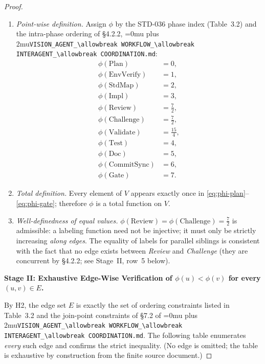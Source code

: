 \documentclass[12pt]{article}
\theoremstyle{definition}
\DeclareRobustCommand{\code}[1]{\begingroup\Urlmuskip=0mu plus 2mu\relax\nolinkurl{#1}\endgroup}
\newcommand{\VisionFlow}{\code{VISION\_AGENT\_\allowbreak WORKFLOW\_\allowbreak INTERAGENT\_\allowbreak COORDINATION.md}}
\begin{document}
\begin{proof}
\begin{enumerate}
  \item \emph{Point-wise definition.} Assign $\phi$ by the STD-036 phase
        index (Table~3.2) and the intra-phase ordering of
        \S4.2.2,
        \VisionFlow{}:
        \begin{align}
          \phi(\mathrm{Plan})        &= 0,   \label{eq:phi-plan}\\
          \phi(\mathrm{EnvVerify})   &= 1,   \label{eq:phi-env}\\
          \phi(\mathrm{StdMap})      &= 2,   \label{eq:phi-std}\\
          \phi(\mathrm{Impl})        &= 3,   \label{eq:phi-impl}\\
          \phi(\mathrm{Review})      &= \tfrac{7}{2}, \label{eq:phi-rev}\\
          \phi(\mathrm{Challenge})   &= \tfrac{7}{2}, \label{eq:phi-chal}\\
          \phi(\mathrm{Validate})    &= \tfrac{15}{4},\label{eq:phi-val}\\
          \phi(\mathrm{Test})        &= 4,   \label{eq:phi-test}\\
          \phi(\mathrm{Doc})         &= 5,   \label{eq:phi-doc}\\
          \phi(\mathrm{CommitSync})  &= 6,   \label{eq:phi-cs}\\
          \phi(\mathrm{Gate})        &= 7.   \label{eq:phi-gate}
        \end{align}

  \item \emph{Total definition.} Every element of $V$ appears exactly once
        in \eqref{eq:phi-plan}--\eqref{eq:phi-gate}; therefore $\phi$ is
        a total function on $V$.

  \item \emph{Well-definedness of equal values.}
        $\phi(\mathrm{Review}) = \phi(\mathrm{Challenge}) = \tfrac{7}{2}$
        is admissible: a labeling function need not be injective; it must
        only be strictly increasing \emph{along edges}.  The equality of
        labels for parallel siblings is consistent with the fact that no
        edge exists between \textit{Review} and \textit{Challenge} (they
        are concurrent by \S4.2.2; see Stage~II, row~5 below).
\end{enumerate}

\medskip
\noindent\textbf{Stage II: Exhaustive Edge-Wise Verification of
$\phi(u) < \phi(v)$ for every $(u,v)\in E$.}

\begin{sloppypar}
By H2, the edge set $E$ is exactly the set of ordering constraints listed in
Table~3.2 and the join-point constraints of \S7.2 of
\VisionFlow{}.
The following table enumerates \emph{every} such edge and confirms the
strict inequality.  (No edge is omitted; the table is exhaustive by
construction from the finite source document.)
\end{sloppypar}


\end{proof}
\end{document}
